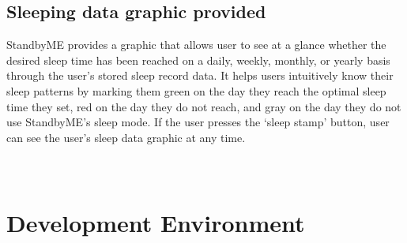 \documentclass[conference]{IEEEtran}
\begin{document}
\subsection{Sleeping data graphic provided}
StandbyME provides a graphic that allows user to see at a glance whether the desired sleep time has been reached on a daily, weekly, monthly, or yearly basis through the user's stored sleep record data. It helps users intuitively know their sleep patterns by marking them green on the day they reach the optimal sleep time they set, red on the day they do not reach, and gray on the day they do not use StandbyME's sleep mode. If the user presses the ‘sleep stamp' button, user can see the user's sleep data graphic at any time.
\\
\\
\\
\section{Development Environment}
\vspace{1\baselineskip}
\end{document}
